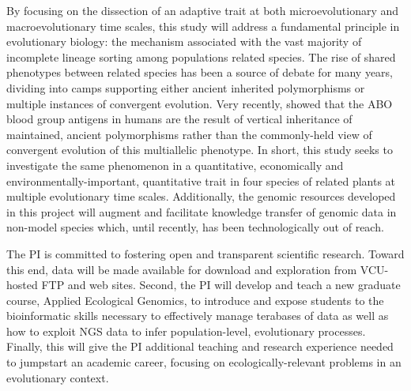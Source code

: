 By focusing on the dissection of an adaptive trait at both microevolutionary and macroevolutionary 
time scales, this study will address a fundamental principle in evolutionary biology: the mechanism 
associated with the vast majority of incomplete lineage sorting among populations related species.  
The rise of shared phenotypes between related species has been a source of debate for many years, dividing 
into camps supporting either ancient inherited polymorphisms or multiple instances of convergent evolution.  Very recently, 
\citet{Segurel:vf} showed that the ABO blood group antigens in humans are the result of vertical inheritance 
of maintained, ancient polymorphisms rather than the commonly-held view of convergent evolution of this 
multiallelic phenotype.  In short, this study seeks to investigate the same phenomenon in a quantitative, economically and 
environmentally-important, quantitative trait in four species of related plants at multiple evolutionary time scales.  Additionally, 
the genomic resources developed in this project will augment and facilitate knowledge transfer of genomic data in non-model 
species which, until recently, has been technologically out of reach.



The PI is committed to fostering open and transparent scientific research.  Toward this end, data will be made 
available for download and exploration from VCU-hosted FTP and web sites.  Second, the PI will develop and teach a new 
graduate course, Applied Ecological Genomics, to introduce and expose students to the bioinformatic skills necessary 
to effectively manage terabases of data as well as how to exploit NGS data to infer population-level, evolutionary processes.   
Finally, this will give the PI additional teaching and research experience needed to jumpstart an academic career, focusing on 
ecologically-relevant problems in an evolutionary context.

